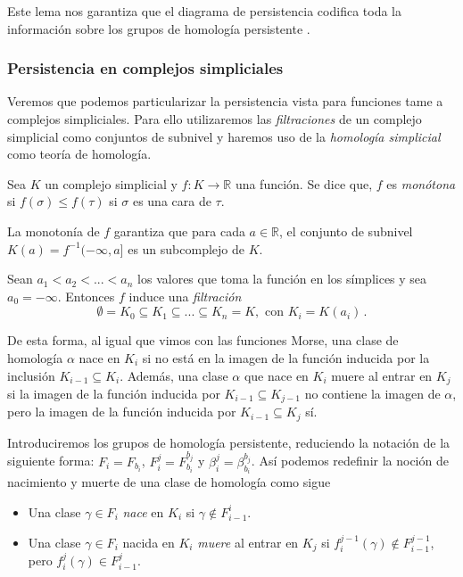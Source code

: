 Este lema nos garantiza que el diagrama de persistencia codifica toda la información sobre los grupos de homología persistente \cite[Chapter~7]{libroEH}.

\subsubsection*{Persistencia en complejos simpliciales}
Veremos que podemos particularizar la persistencia vista para funciones tame a complejos simpliciales. Para ello utilizaremos las \emph{filtraciones} de un complejo simplicial como conjuntos de subnivel y haremos uso de la \emph{homología simplicial} como teoría de homología.

\begin{definition}
Sea $K$ un complejo simplicial y $f: K \to \mathbb{R}$ una función. Se dice que, $f$ es \emph{monótona} si $f(\sigma) \leq f(\tau)$ si $\sigma$ es una cara de $\tau$.
\end{definition}
\begin{sloppypar}
La monotonía de $f$ garantiza que para cada $a \in \mathbb{R}$, el conjunto de subnivel ${K(a) = f^{-1}(-\infty,a]}$ es un subcomplejo de $K$.
\end{sloppypar}


\begin{definition}
Sean $a_1 < a_2 < ... < a_n$ los valores que toma la función en los símplices y sea $a_0 = -\infty$. Entonces $f$ induce una \emph{filtración}
\[
\emptyset = K_0 \subseteq K_1 \subseteq ... \subseteq K_n = K, \text{ con } K_i=K(a_i)\,.
\]
\end{definition}

De esta forma, al igual que vimos con las funciones Morse, una clase de homología $\alpha$ nace en $K_i$ si no está en la imagen de la función inducida por la inclusión $K_{i-1} \subseteq K_i$. Además, una clase $\alpha$ que nace en $K_i$ muere al entrar en $K_j$ si la imagen de la función inducida por $K_{i-1} \subseteq K_{j-1}$ no contiene la imagen de $\alpha$, pero la imagen de la función inducida por $K_{i-1} \subseteq K_j$ sí.

Introduciremos los grupos de homología persistente, reduciendo la notación de la siguiente forma: $F_i = F_{b_i}$, $F_{i}^{j}=F_{b_i}^{b_j}$ y $\beta_{i}^{j}=\beta_{b_i}^{b_j}$. Así podemos redefinir la noción de nacimiento y muerte de una clase de homología como sigue
\begin{itemize}
	\item Una clase $\gamma \in F_i$ \emph{nace} en $K_i$ si $\gamma \notin F_{i-1}^{i}$.
	\item Una clase $\gamma \in F_i$ nacida en $K_i$ \emph{muere} al entrar en $K_j$ si $f_{i}^{j-1}(\gamma)\notin F_{i-1}^{j-1}$, pero $f_{i}^{j}(\gamma)\in F_{i-1}^{j}$. 
\end{itemize} 

